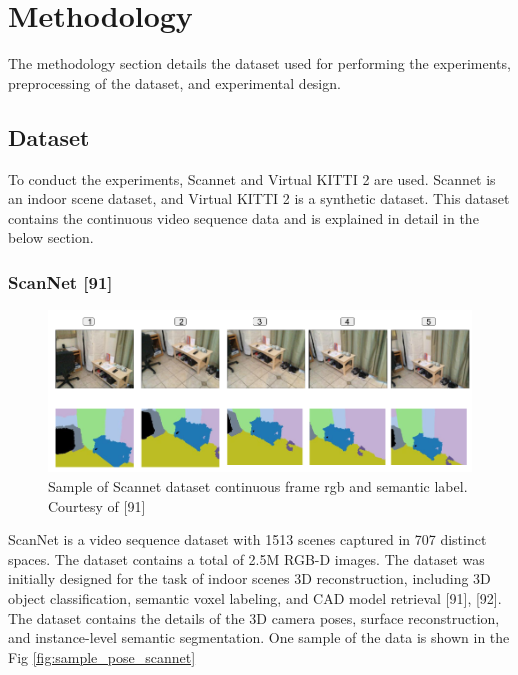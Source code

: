 

    \chapter{Methodology}
	\label{chap:methodology}
	
	The methodology section details the dataset used for performing the experiments, preprocessing of the dataset, and experimental design.

    \section{Dataset}
    
	To conduct the experiments, Scannet and Virtual KITTI 2 are used. Scannet is an indoor scene dataset, and Virtual KITTI 2 is a synthetic dataset. This dataset contains the continuous video sequence data and is explained in detail in the below section.
    
    \subsection{ScanNet [91]}

	\begin{figure}
		\centering
		\includegraphics[width=17cm]{images/images_segm_scannet.png}
		\caption{Sample of Scannet dataset continuous frame rgb and semantic label. Courtesy of [91] }
		\label{fig:sample_rgb_seg_scannet}
	\end{figure}
        
	ScanNet is a video sequence dataset with 1513 scenes captured in 707 distinct spaces. The dataset contains a total of 2.5M RGB-D images. The dataset was initially designed for the task of indoor scenes 3D reconstruction, including 3D object classification, semantic voxel labeling, and CAD model retrieval [91], [92]. The dataset contains the details of the 3D camera poses, surface reconstruction, and instance-level semantic segmentation. One sample of the data is shown in the Fig \ref{fig:sample_pose_scannet}
	
